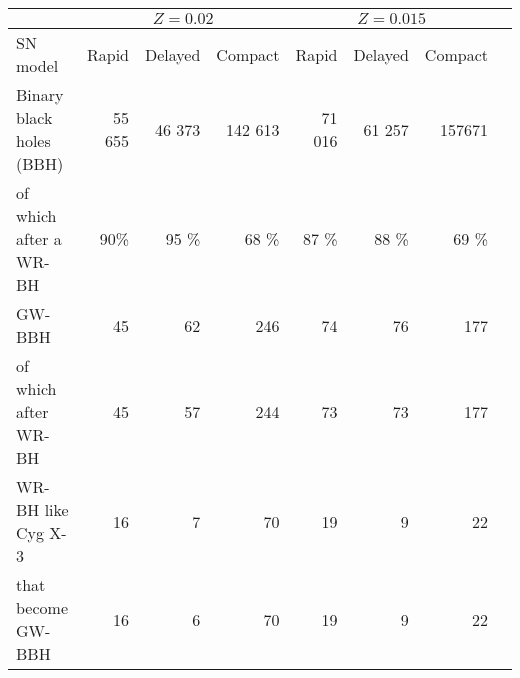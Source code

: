 \documentclass{standalone}
\begin{document}
	\begin{tabular}{lrrrrrrr}
		\toprule
		& \multicolumn{3}{c}{$Z=0.02$} & \multicolumn{3}{c}{$Z=0.015$}  \\
		\midrule
		SN model & Rapid & Delayed & Compact&  Rapid & Delayed & Compact\\
		\midrule
		Binary black holes (BBH)  		& 55 655 & 46 373 & 142 613 & 71 016 & 61 257 & 157671 \\
		of which after a WR-BH	& 90\% & 95 \% & 68 \% & 87 \% & 88 \%& 69 \% \\
		\midrule
		GW-BBH  		& 45 & 62 & 246 & 74 & 76 & 177 \\
		of which after WR-BH	& 45 & 57 & 244 & 73 & 73 & 177 \\
		\midrule
		WR-BH like Cyg X-3  	 & 16 & 7 & 70 & 19 & 9 & 22 \\
		that become GW-BBH   		 & 16 & 6 & 70 & 19 & 9 & 22 \\
		\bottomrule 	
	\end{tabular}
\end{document}
